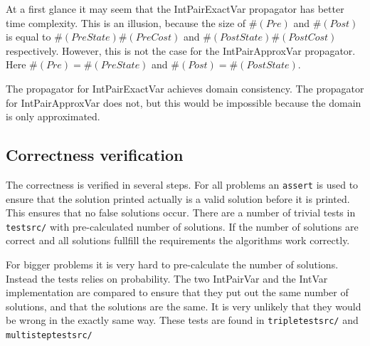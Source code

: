 \documentclass[a4paper,11pt]{article}
\begin{document}
At a first glance it may seem that the IntPairExactVar propagator has better time complexity. This is an illusion, because the size of $\#(Pre)$ and $\#(Post)$ is equal to $\#(PreState)\#(PreCost)$ and $\#(PostState)\#(PostCost)$ respectively. However, this is not the case for the IntPairApproxVar propagator. Here $\#(Pre)=\#(PreState)$ and $\#(Post)=\#(PostState)$. 

The propagator for IntPairExactVar achieves domain consistency. The propagator for IntPairApproxVar does not, but this would be impossible because the domain is only approximated.

\subsection{Correctness verification}
The correctness is verified in several steps. For all problems an \texttt{assert} is used to ensure that the solution printed actually is a valid solution before it is printed. This ensures that no false solutions occur. There are a number of trivial tests in \texttt{testsrc/} with pre-calculated number of solutions. If the number of solutions are correct and all solutions fullfill the requirements the algorithms work correctly.

For bigger problems it is very hard to pre-calculate the number of solutions. Instead the tests relies on probability. The two IntPairVar and the IntVar implementation are compared to ensure that they put out the same number of solutions, and that the solutions are the same. It is very unlikely that they would be wrong in the exactly same way. These tests are found in \texttt{tripletestsrc/} and \texttt{multisteptestsrc/}
\end{document}
